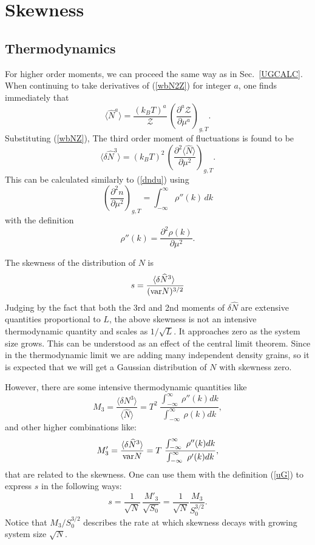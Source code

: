 \documentclass[aps,twocolumn,pra,superscriptaddress,nofootinbib,amsmath,amssymb,floats,floatfix,english]{revtex4-1}
\newcommand{\op}[1]{\widehat{#1}}
\newcommand{\mc}[1]{{\mathcal{#1}}}
\newcommand{\eqn}[1]{(\ref{#1})}
\renewcommand{\eq}[2]{\begin{equation}\label{#1}#2\end{equation}}
\begin{document}
\section{Skewness}
\label{SKEW}

\subsection{Thermodynamics} 
\label{THERM3}

For higher order moments, we can proceed the same way as in Sec.~\ref{UGCALC}. 
When continuing to take derivatives of \eqn{wbN2Z} for integer $a$, one finds immediately that
\eq{wbNaZ}{
\langle \op{N}^a \rangle = \frac{(k_BT)^a}{\mc{Z}}\,\left(\frac{\partial^a\mc{Z}}{\partial\mu^a}\right)_{g,T}.
}
Substituting \eqn{wbNZ}, The third order moment of fluctuations is found to be
\eq{wbN3mu}{
\langle\delta\op{N}^3\rangle = (k_BT)^2\,\left(\frac{\partial^2\langle \op{N}\rangle}{\partial\mu^2}\right)_{g,T}.
}
This can be calculated similarly to \eqn{dndu} using
\eq{dndu2}{
\left(\frac{\partial^2 n}{\partial\mu^2}\right)_{g,T} = \int_{-\infty}^{\infty} \rho''(k)\, dk
}
with the definition
\eq{dpdu2}{
\rho''(k) = \frac{\partial^2\rho(k)}{\partial\mu^2}.
}



The skewness of the distribution of $N$ is
\eq{skewness}{
s = \frac{\langle\delta\op{N}^3\rangle\ }{({\rm var}N)^{3/2}}
}
Judging by the fact that both the 3rd and 2nd moments of $\delta\op{N}$ are extensive quantities proportional to $L$, the above skewness is not an intensive thermodynamic quantity and scales as $1/\sqrt{L}$. 
It approaches zero as the system size grows.
This can be understood as an effect of the central limit theorem. Since in the thermodynamic limit we are adding many independent density grains, so it is expected that we will get a Gaussian distribution of $N$ with skewness zero. 

However, there are some  intensive thermodynamic quantities like
\eq{Th3}{
M_3 = \frac{\langle\delta N^3\rangle}{\langle\op{N}\rangle} = T^2\ \frac{\int_{-\infty}^{\infty}\ \rho''(k) dk}{\int_{-\infty}^{\infty}\ \rho(k) dk},
}
and other higher combinations like:
\eq{Th3b}{
M^{\prime}_3 = \frac{\langle\delta\op{N}^3\rangle}{{\rm var}N} 
= T\ \frac{\int_{-\infty}^{\infty}\ \rho''(k) dk}{\int_{-\infty}^{\infty}\ \rho'(k) dk},
}
that are related to the skewness. One can use them with the definition \eqn{uG} to express $s$ in the following ways:
\eq{S2}{
s = \frac{1}{\sqrt{N}}\,\frac{M'_3}{\sqrt{S_0}} = \frac{1}{\sqrt{N}}\frac{M_3}{S_0^{3/2}}.
}
Notice that $M_3/S_0^{3/2}$ describes the rate at which skewness decays with growing system size $\sqrt{N}$.
\end{document}
